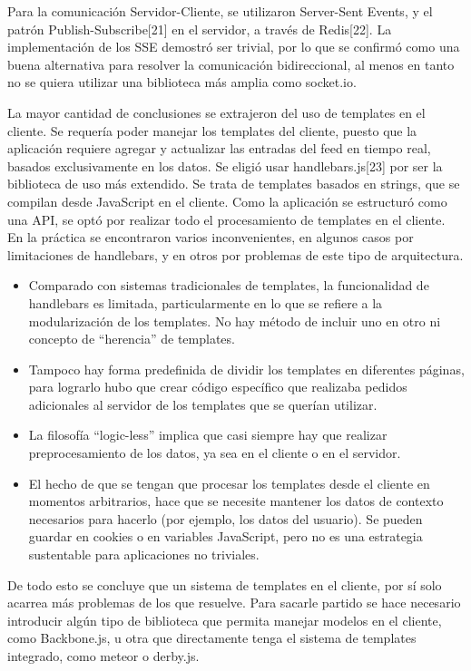 \documentclass[doc,helv,longtable]{article}
\begin{document}
Para la comunicación Servidor-Cliente, se utilizaron Server-Sent Events, y el patrón Publish-Subscribe[21] en el servidor, a través de Redis[22]. La implementación de los SSE demostró ser trivial, por lo que se confirmó como una buena alternativa para resolver la comunicación bidireccional, al menos en tanto no se quiera utilizar una biblioteca más amplia como socket.io.

La mayor cantidad de conclusiones se extrajeron del uso de templates en el cliente. Se requería poder manejar los templates del cliente, puesto que la aplicación requiere agregar y actualizar las entradas del feed en tiempo real, basados exclusivamente en los datos. Se eligió usar handlebars.js[23] por ser la biblioteca de uso más extendido. Se trata de templates basados en strings, que se compilan desde JavaScript en el cliente. Como la aplicación se estructuró como una API, se optó por realizar todo el procesamiento de templates en el cliente. En la práctica se encontraron varios inconvenientes, en algunos casos por limitaciones de handlebars, y en otros por problemas de este tipo de arquitectura.
\begin{itemize}
\item  Comparado con sistemas tradicionales de templates, la funcionalidad de handlebars es limitada, particularmente en lo que se refiere a la modularización de los templates. No hay método de incluir uno en otro ni concepto de “herencia” de templates. 
\item  Tampoco hay forma predefinida de dividir los templates en diferentes páginas, para lograrlo hubo que crear código específico que realizaba pedidos adicionales al servidor de los templates que se querían utilizar.
\item  La filosofía “logic-less” implica que casi siempre hay que realizar preprocesamiento de los datos, ya sea en el cliente o en el servidor.
\item  El hecho de que se tengan que procesar los templates desde el cliente en momentos arbitrarios, hace que se necesite mantener los datos de contexto necesarios para hacerlo (por ejemplo, los datos del usuario). Se pueden guardar en cookies o en variables JavaScript, pero no es una estrategia sustentable para aplicaciones no triviales.

\end{itemize}


De todo esto se concluye que un sistema de templates en el cliente, por sí solo acarrea más problemas de los que resuelve. Para sacarle partido se hace necesario introducir algún tipo de biblioteca que permita manejar modelos en el cliente, como Backbone.js, u otra que directamente tenga el sistema de templates integrado, como meteor o derby.js.
\end{document}
